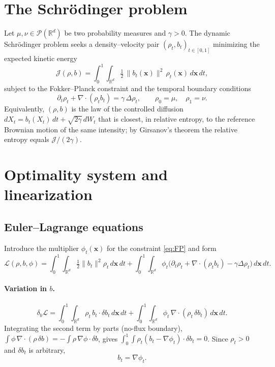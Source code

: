 \documentclass[11pt]{article}
\theoremstyle{remark}
\newcommand{\xv}{\mathbf{x}}
\newcommand{\grad}{\nabla}
\newcommand{\dive}{\grad\!\cdot\!}
\newcommand{\Rd}{\mathbb{R}^d}
\begin{document}
\section{The Schr\"odinger problem}
\label{sec:sb}

Let $\mu,\nu\in\mathcal{P}(\Rd)$ be two probability measures and $\gamma>0$. The
dynamic Schr\"odinger problem seeks a density--velocity pair
$(\rho_t,b_t)_{t\in[0,1]}$ minimizing the expected kinetic energy
\begin{equation}
\label{eq:J}
\mathcal{J}(\rho,b)=\int_0^1\!\!\int_{\Rd}\tfrac12\,\|b_t(\xv)\|^2\,\rho_t(\xv)\,d\xv\,dt,
\end{equation}
subject to the Fokker--Planck constraint and the temporal boundary conditions
\begin{equation}
\label{eq:FP}
\partial_t\rho_t + \dive(\rho_t b_t) = \gamma\,\Delta\rho_t,
\qquad \rho_0=\mu,\quad \rho_1=\nu.
\end{equation}
Equivalently, $(\rho,b)$ is the law of the controlled diffusion
$dX_t=b_t(X_t)\,dt+\sqrt{2\gamma}\,dW_t$ that is closest, in relative entropy, to
the reference Brownian motion of the same intensity; by Girsanov's theorem the
relative entropy equals $\mathcal{J}/(2\gamma)$.

\section{Optimality system and linearization}
\label{sec:opt}

\subsection{Euler--Lagrange equations}
Introduce the multiplier $\phi_t(\xv)$ for the constraint \eqref{eq:FP} and form
\begin{equation}
\label{eq:Lag}
\mathcal{L}(\rho,b,\phi)=\int_0^1\!\!\int_{\Rd}\tfrac12\|b_t\|^2\rho_t\,d\xv\,dt
+\int_0^1\!\!\int_{\Rd}\phi_t\bigl(\partial_t\rho_t+\dive(\rho_t b_t)-\gamma\Delta\rho_t\bigr)\,d\xv\,dt.
\end{equation}

\paragraph{Variation in $b$.}
\begin{equation}
\delta_b\mathcal{L}=\int_0^1\!\!\int_{\Rd}\rho_t\,b_t\cdot\delta b_t\,d\xv\,dt
+\int_0^1\!\!\int_{\Rd}\phi_t\,\dive(\rho_t\,\delta b_t)\,d\xv\,dt .
\end{equation}
Integrating the second term by parts (no-flux boundary), $\int\phi\,\dive(\rho\,\delta b)=-\int\rho\,\grad\phi\cdot\delta b$, gives $\int_0^1\!\!\int\rho_t(b_t-\grad\phi_t)\cdot\delta b_t=0$. Since $\rho_t>0$ and $\delta b_t$ is arbitrary,
\begin{equation}
\label{eq:bopt}
b_t=\grad\phi_t .
\end{equation}
\end{document}
